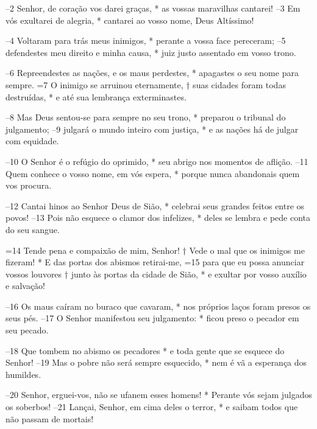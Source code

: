 –2 Senhor, de coração vos darei graças, *
as vossas maravilhas cantarei!
–3 Em vós exultarei de alegria, *
cantarei ao vosso nome, Deus Altíssimo!

–4 Voltaram para trás meus inimigos, *
perante a vossa face pereceram;
–5 defendestes meu direito e minha causa, *
juiz justo assentado em vosso trono.

–6 Repreendestes as nações, e os maus perdestes, *
apagastes o seu nome para sempre.
=7 O inimigo se arruinou eternamente, †
suas cidades foram todas destruídas, *
e até sua lembrança exterminastes.

–8 Mas Deus sentou-se para sempre no seu trono, *
preparou o tribunal do julgamento;
–9 julgará o mundo inteiro com justiça, *
e as nações há de julgar com equidade.

–10 O Senhor é o refúgio do oprimido, *
seu abrigo nos momentos de aflição.
–11 Quem conhece o vosso nome, em vós espera, *
porque nunca abandonais quem vos procura.

–12 Cantai hinos ao Senhor Deus de Sião, *
celebrai seus grandes feitos entre os povos!
 –13 Pois não esquece o clamor dos infelizes, *
deles se lembra e pede conta do seu sangue.

=14 Tende pena e compaixão de mim, Senhor! †
Vede o mal que os inimigos me fizeram! *
E das portas dos abismos retirai-me,
=15 para que eu possa anunciar vossos louvores †
junto às portas da cidade de Sião, *
e exultar por vosso auxílio e salvação!

–16 Os maus caíram no buraco que cavaram, *
nos próprios laços foram presos os seus pés.
–17 O Senhor manifestou seu julgamento: *
ficou preso o pecador em seu pecado.

–18 Que tombem no abismo os pecadores *
e toda gente que se esquece do Senhor!
–19 Mas o pobre não será sempre esquecido, *
nem é vã a esperança dos humildes.

–20 Senhor, erguei-vos, não se ufanem esses homens! *
Perante vós sejam julgados os soberbos!
–21 Lançai, Senhor, em cima deles o terror, *
e saibam todos que não passam de mortais!